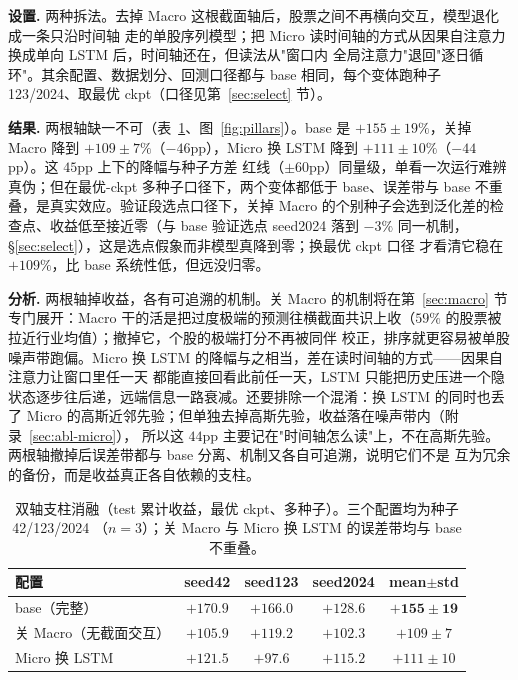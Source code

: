 \documentclass[a4paper,11pt,fontset=fandol]{ctexart}
\begin{document}
\textbf{\heiti 设置.} 两种拆法。去掉 Macro 这根截面轴后，股票之间不再横向交互，模型退化成一条只沿时间轴
走的单股序列模型；把 Micro 读时间轴的方式从因果自注意力换成单向 LSTM 后，时间轴还在，但读法从"窗口内
全局注意力"退回"逐日循环"。其余配置、数据划分、回测口径都与 base 相同，每个变体跑种子 123/2024、取最优
ckpt（口径见第~\ref{sec:select} 节）。

\textbf{\heiti 结果.} 两根轴缺一不可（表~\ref{tab:pillars}、图~\ref{fig:pillars}）。base 是 $+155\pm19\%$，关掉
Macro 降到 $+109\pm7\%$（$-46$pp），Micro 换 LSTM 降到 $+111\pm10\%$（$-44$pp）。这 $45$pp 上下的降幅与种子方差
红线（$\pm60$pp）同量级，单看一次运行难辨真伪；但在最优-ckpt 多种子口径下，两个变体都低于 base、误差带与
base 不重叠，是真实效应。验证段选点口径下，关掉 Macro 的个别种子会选到泛化差的检查点、收益低至接近零（与
base 验证选点 seed2024 落到 $-3\%$ 同一机制，§\ref{sec:select}），这是选点假象而非模型真降到零；换最优 ckpt 口径
才看清它稳在 $+109\%$，比 base 系统性低，但远没归零。

\textbf{\heiti 分析.} 两根轴掉收益，各有可追溯的机制。关 Macro 的机制将在第~\ref{sec:macro} 节专门展开：Macro
干的活是把过度极端的预测往横截面共识上收（$59\%$ 的股票被拉近行业均值）；撤掉它，个股的极端打分不再被同伴
校正，排序就更容易被单股噪声带跑偏。Micro 换 LSTM 的降幅与之相当，差在读时间轴的方式——因果自注意力让窗口里任一天
都能直接回看此前任一天，LSTM 只能把历史压进一个隐状态逐步往后递，远端信息一路衰减。还要排除一个混淆：换
LSTM 的同时也丢了 Micro 的高斯近邻先验；但单独去掉高斯先验，收益落在噪声带内（附录~\ref{sec:abl-micro}），
所以这 $44$pp 主要记在"时间轴怎么读"上，不在高斯先验。两根轴撤掉后误差带都与 base 分离、机制又各自可追溯，说明它们不是
互为冗余的备份，而是收益真正各自依赖的支柱。

\begin{table}[H]
\centering
\caption{双轴支柱消融（test 累计收益，最优 ckpt、多种子）。三个配置均为种子 42/123/2024
（$n{=}3$）；关 Macro 与 Micro 换 LSTM 的误差带均与 base 不重叠。}
\label{tab:pillars}
\begin{tabular}{lcccc}
\toprule
配置 & seed42 & seed123 & seed2024 & mean$\pm$std \\
\midrule
base（完整）        & $+170.9$ & $+166.0$ & $+128.6$ & $\mathbf{+155\pm19}$ \\
关 Macro（无截面交互） & $+105.9$ & $+119.2$ & $+102.3$ & $+109\pm7$ \\
Micro 换 LSTM       & $+121.5$ & $+97.6$  & $+115.2$ & $+111\pm10$ \\
\bottomrule
\end{tabular}
\end{table}
\end{document}
